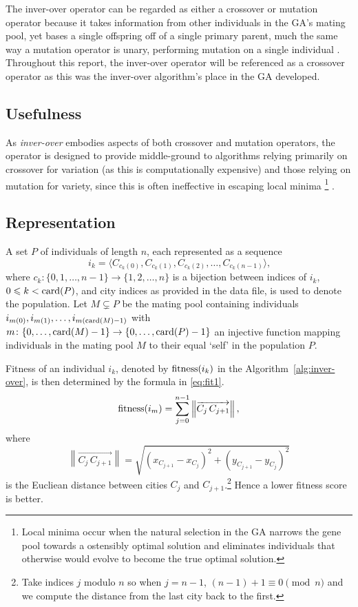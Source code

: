 The inver-over operator can be regarded as either a crossover or mutation 
operator because it takes information from other individuals in the GA's
mating pool, yet bases a single offspring off of a single primary parent, much 
the same way a mutation operator is unary, performing mutation on a single
individual \cite{p44}. Throughout this report, the inver-over operator will 
be referenced as a crossover operator as this was the inver-over 
algorithm's place in the GA developed.

\subsection{Usefulness}
As {\em inver-over} embodies aspects of both crossover and mutation 
operators, the operator  is designed to provide middle-ground to 
algorithms relying primarily on crossover for variation (as this is 
computationally expensive) and those relying on mutation for variety,
since this is often ineffective in escaping local minima%
\footnote{Local minima occur when the natural selection in the GA 
	narrows the gene pool towards a ostensibly optimal solution and 
	eliminates individuals that otherwise would evolve to become the 
	true optimal solution.} \cite{p44}.


\subsection{Representation}
A set $P$ of individuals of length $n$, each represented as a sequence
\begin{equation*}
i_k = \langle C_{c_k(0)}, C_{c_k(1)}, C_{c_k(2)}, \ldots, C_{c_k(n-1)} \rangle\text{,}
\end{equation*}
where $c_k\colon \{0, 1, \ldots, n-1\} \to \{ 1, 2, \ldots, n \}$ is a bijection 
between indices of $i_k$, $0 \leqslant k < \operatorname{card}(P)$, and city indices as 
provided in the data file, is used to denote the population. Let 
$M \subsetneq P$ be the mating pool containing individuals 
$i_{m(0)}, i_{m(1)},\ldots, i_{m(\operatorname{card}(M)-1)}$ with $m\colon 
\{0, \ldots, \operatorname{card}(M)-1\} \to \{0, \ldots, \operatorname{card}(P) -1\}$
 an injective function mapping individuals in the mating pool $M$ to 
their equal `self' in the population $P$.

Fitness of an individual $i_k$, denoted by $\operatorname{fitness}(i_k)$ in the Algorithm~\ref{alg:inver-over}, is then determined by the formula in 
\eqref{eq:fit1}.
\begin{equation}
\operatorname{fitness}(i_m) = \sum_{j=0}^{n-1} \left\lVert \overrightarrow{C_j \, C_{j+1}} \right\rVert, \label{eq:fit1} 
\end{equation}
where 
\begin{equation*}
\left\lVert \overrightarrow{C_j \, C_{j+1}} \right\rVert = \sqrt{(x_{C_{j+1}} - x_{C_j})^2 + (y_{C_{j+1}} - y_{C_j})^2}
\end{equation*}
is the Eucliean distance between cities $C_j$ and $C_{j+1}$.\footnote{
	Take indices $j$ modulo $n$ so when $j=n-1$, $(n-1)+1  \equiv 0 \pmod n$
	 and we compute the distance from the last city back to the first.} Hence
a lower fitness score is better.

